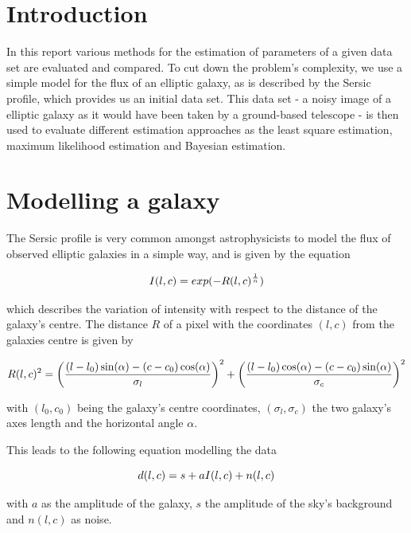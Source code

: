 
\section{Introduction}
In this report various methods for the estimation of parameters of a given data set are evaluated and compared. To cut down the problem's complexity, we use a simple model for the flux of an elliptic galaxy, as is described by the Sersic profile, which provides us an initial data set. This data set - a noisy image of a elliptic galaxy as it would have been taken by a ground-based telescope - is then used to evaluate different estimation approaches as the least square estimation, maximum likelihood estimation and Bayesian estimation.\\

\section{Modelling a galaxy}
The Sersic profile is very common amongst astrophysicists to model the flux of observed elliptic galaxies in a simple way, and is given by the equation

\begin{equation}
	\centering
	I(l,c) = exp(-R(l,c)^{\frac{1}{n}})
\end{equation}

which describes the variation of intensity with respect to the distance of the galaxy's centre.
The distance $R$ of a pixel with the coordinates $(l,c)$ from the galaxies centre is given by 

\begin{equation}
	\centering
	R(l,c)^2 = \bigg(\frac{(l-l_0)\sin(\alpha) - (c - c_0)\cos(\alpha)}{\sigma_l}\bigg)^2 + \bigg(\frac{(l-l_0)\cos(\alpha) - (c - c_0)\sin(\alpha)}{\sigma_c}\bigg)^2
\end{equation}

with $(l_0,c_0)$ being the galaxy's centre coordinates, $(\sigma_l,\sigma_c)$ the two galaxy's axes length and the horizontal angle $\alpha$.

This leads to the following equation modelling the data

\begin{equation}
	\centering
	d(l,c) = s + a I(l,c) + n(l,c)
\label{eq:dlc}
\end{equation}

with $a$ as the amplitude of the galaxy, $s$ the amplitude of the sky's background and $n(l,c)$ as noise.


